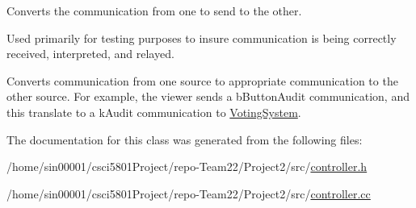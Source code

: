 Converts the communication from one to send to the other. 

Used primarily for testing purposes to insure communication is being correctly received, interpreted, and relayed.

Converts communication from one source to appropriate communication to the other source. For example, the viewer sends a b\+Button\+Audit communication, and this translate to a k\+Audit communication to \hyperlink{classVotingSystem}{Voting\+System}. 

The documentation for this class was generated from the following files\+:\begin{DoxyCompactItemize}
\item 
/home/sin00001/csci5801\+Project/repo-\/\+Team22/\+Project2/src/\hyperlink{controller_8h}{controller.\+h}\item 
/home/sin00001/csci5801\+Project/repo-\/\+Team22/\+Project2/src/\hyperlink{controller_8cc}{controller.\+cc}\end{DoxyCompactItemize}

